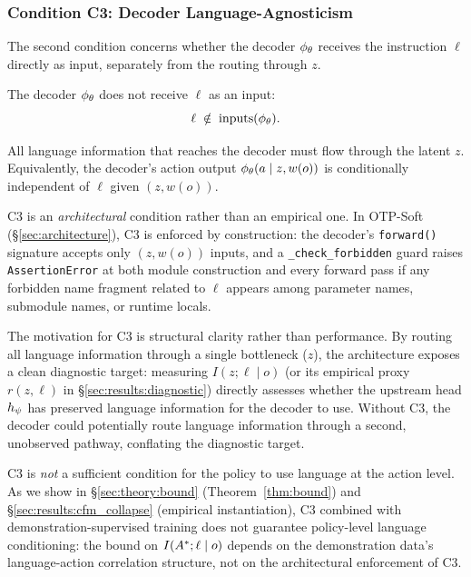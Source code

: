 \subsubsection{Condition C3: Decoder Language-Agnosticism}
\label{sec:theory:c3}

The second condition concerns whether the decoder $\phi_{\theta}$ receives the instruction
$\ell$ directly as input, separately from the routing through $z$.

\begin{condition}
\label{cond:c3}
The decoder $\phi_{\theta}$ does not receive $\ell$ as an input:
\begin{equation}
\ell \;\notin\; \mathrm{inputs}(\phi_{\theta}).
\label{eq:c3}
\end{equation}
\end{condition}

All language information that reaches the decoder must flow through the latent $z$.
Equivalently, the decoder's action output $\phi_{\theta}(a \mid z, w(o))$ is conditionally
independent of $\ell$ given $(z, w(o))$.

C3 is an \emph{architectural} condition rather than an empirical one. In OTP-Soft
(\S\ref{sec:architecture}), C3 is enforced by construction: the decoder's \texttt{forward()}
signature accepts only $(z, w(o))$ inputs, and a \texttt{\_check\_forbidden} guard raises
\texttt{AssertionError} at both module construction and every forward pass if any
forbidden name fragment related to $\ell$ appears among parameter names, submodule names,
or runtime locals.

The motivation for C3 is structural clarity rather than performance. By routing all
language information through a single bottleneck ($z$), the architecture exposes a clean
diagnostic target: measuring $I(z; \ell \mid o)$ (or its empirical proxy $r(z, \ell)$ in
\S\ref{sec:results:diagnostic}) directly assesses whether the upstream head $h_{\psi}$ has
preserved language information for the decoder to use. Without C3, the decoder could
potentially route language information through a second, unobserved pathway, conflating
the diagnostic target.

C3 is \emph{not} a sufficient condition for the policy to use language at the action
level. As we show in \S\ref{sec:theory:bound} (Theorem~\ref{thm:bound}) and
\S\ref{sec:results:cfm_collapse} (empirical instantiation), C3 combined with
demonstration-supervised training does not guarantee policy-level language conditioning:
the bound on $I(A^{*}; \ell \mid o)$ depends on the demonstration data's language-action
correlation structure, not on the architectural enforcement of C3.

